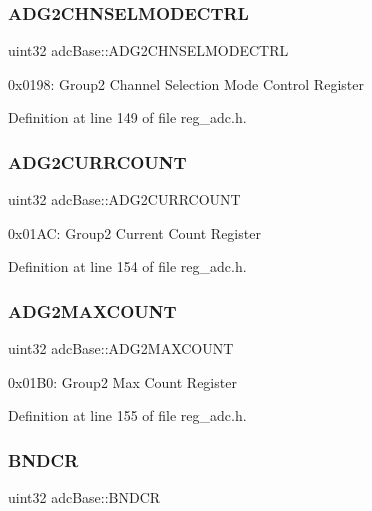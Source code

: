 \subsubsection{\texorpdfstring{A\+D\+G2\+C\+H\+N\+S\+E\+L\+M\+O\+D\+E\+C\+T\+RL}{ADG2CHNSELMODECTRL}}
{\footnotesize\ttfamily uint32 adc\+Base\+::\+A\+D\+G2\+C\+H\+N\+S\+E\+L\+M\+O\+D\+E\+C\+T\+RL}

0x0198\+: Group2 Channel Selection Mode Control Register 

Definition at line 149 of file reg\+\_\+adc.\+h.

\mbox{\label{structadcBase_ac3bbc70fbb9e8d4c2cbd3b3d4ed648ec}} 
\subsubsection{\texorpdfstring{A\+D\+G2\+C\+U\+R\+R\+C\+O\+U\+NT}{ADG2CURRCOUNT}}
{\footnotesize\ttfamily uint32 adc\+Base\+::\+A\+D\+G2\+C\+U\+R\+R\+C\+O\+U\+NT}

0x01\+AC\+: Group2 Current Count Register 

Definition at line 154 of file reg\+\_\+adc.\+h.

\mbox{\label{structadcBase_af0ec2c5fb4057a32b3f9431cc77a4a78}} 
\subsubsection{\texorpdfstring{A\+D\+G2\+M\+A\+X\+C\+O\+U\+NT}{ADG2MAXCOUNT}}
{\footnotesize\ttfamily uint32 adc\+Base\+::\+A\+D\+G2\+M\+A\+X\+C\+O\+U\+NT}

0x01\+B0\+: Group2 Max Count Register 

Definition at line 155 of file reg\+\_\+adc.\+h.

\mbox{\label{structadcBase_a8b0c93685565a1cb68e820f3e97c0407}} 
\subsubsection{\texorpdfstring{B\+N\+D\+CR}{BNDCR}}
{\footnotesize\ttfamily uint32 adc\+Base\+::\+B\+N\+D\+CR}

